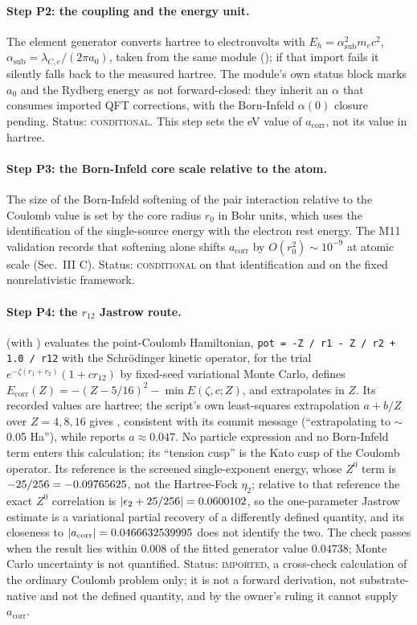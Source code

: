 \documentclass[aps,prd,onecolumn,amsmath,amssymb,longbibliography,floatfix,nofootinbib]{revtex4-2}
\newcommand{\acorr}{a_{\mathrm{corr}}}
\newcommand{\st}[1]{\textsc{#1}}
\begin{document}
\paragraph{Step P2: the coupling and the energy unit.} The element generator converts hartree to electronvolts with $E_h=\alpha_{\mathrm{sub}}^2m_ec^2$, $\alpha_{\mathrm{sub}}=\lambda_{C,e}/(2\pi a_0)$, taken from the same module (); if that import fails it silently falls back to the measured hartree. The module's own status block marks $a_0$ and the Rydberg energy as not forward-closed: they inherit an $\alpha$ that consumes imported QFT corrections, with the Born-Infeld $\alpha(0)$ closure pending. Status: \st{conditional}. This step sets the eV value of $\acorr$, not its value in hartree.

\paragraph{Step P3: the Born-Infeld core scale relative to the atom.} The size of the Born-Infeld softening of the pair interaction relative to the Coulomb value is set by the core radius $r_0$ in Bohr units, which uses the identification of the single-source energy with the electron rest energy. The M11 validation records that softening alone shifts $\acorr$ by $O(r_0^2)\sim10^{-9}$ at atomic scale (Sec.~III C). Status: \st{conditional} on that identification and on the fixed nonrelativistic framework.

\paragraph{Step P4: the $r_{12}$ Jastrow route.}  (with ) evaluates the point-Coulomb Hamiltonian, \texttt{pot = -Z / r1 - Z / r2 + 1.0 / r12} with the Schr\"odinger kinetic operator, for the trial $e^{-\zeta(r_1+r_2)}(1+cr_{12})$ by fixed-seed variational Monte Carlo, defines $E_{\mathrm{corr}}(Z)=-(Z-5/16)^2-\min E(\zeta,c;Z)$, and extrapolates in $Z$. Its recorded values are \VmcValuesVal{} hartree; the script's own least-squares extrapolation $a+b/Z$ over $Z=4,8,16$ gives \VmcExtrapVal, consistent with its commit message (``extrapolating to $\sim$0.05 Ha''), while  reports $a\approx0.047$. No particle expression and no Born-Infeld term enters this calculation; its ``tension cusp'' is the Kato cusp of the Coulomb operator. Its reference is the screened single-exponent energy, whose $Z^0$ term is $-25/256=-0.09765625$, not the Hartree-Fock $\eta_2$; relative to that reference the exact $Z^0$ correlation is $|\epsilon_2+25/256|=0.0600102$, so the one-parameter Jastrow estimate is a variational partial recovery of a differently defined quantity, and its closeness to $|\acorr|=\AcorrMagVal$ does not identify the two. The check passes when the result lies within $0.008$ of the fitted generator value $0.04738$; Monte Carlo uncertainty is not quantified. Status: \st{imported}, a cross-check calculation of the ordinary Coulomb problem only; it is not a forward derivation, not substrate-native and not the defined quantity, and by the owner's ruling it cannot supply $\acorr$.
\end{document}
